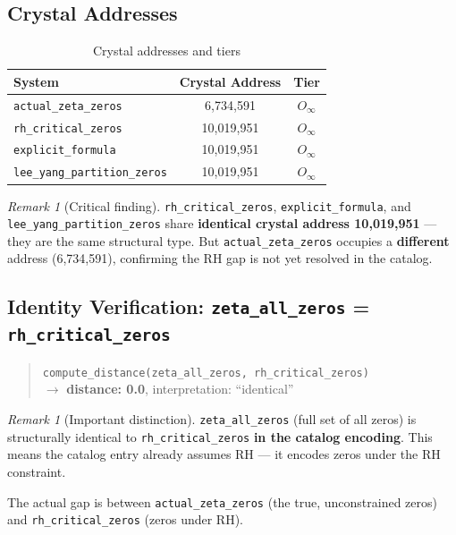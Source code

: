 \documentclass[12pt,oneside]{article}
\theoremstyle{definition}
\theoremstyle{remark}
\newtheorem{remark}[theorem]{Remark}
\begin{document}
\subsection{Crystal Addresses}

\begin{table}[htbp]
\centering
\caption{Crystal addresses and tiers}
\begin{tabular}{lcc}
\toprule
System & Crystal Address & Tier \\
\midrule
\texttt{actual\_zeta\_zeros}        & 6,734,591  & $O_\infty$ \\
\texttt{rh\_critical\_zeros}        & 10,019,951 & $O_\infty$ \\
\texttt{explicit\_formula}          & 10,019,951 & $O_\infty$ \\
\texttt{lee\_yang\_partition\_zeros} & 10,019,951 & $O_\infty$ \\
\bottomrule
\end{tabular}
\end{table}

\begin{remark}[Critical finding]
\texttt{rh\_critical\_zeros}, \texttt{explicit\_formula}, and \texttt{lee\_yang\_partition\_zeros} share \textbf{identical crystal address 10,019,951} --- they are the same structural type. But \texttt{actual\_zeta\_zeros} occupies a \textbf{different} address (6,734,591), confirming the RH gap is not yet resolved in the catalog.
\end{remark}

\subsection{Identity Verification: \texttt{zeta\_all\_zeros} = \texttt{rh\_critical\_zeros}}

\begin{quote}
\texttt{compute\_distance(zeta\_all\_zeros, rh\_critical\_zeros)}\\
$\to$ \textbf{distance: 0.0}, interpretation: ``identical''
\end{quote}

\begin{remark}[Important distinction]
\texttt{zeta\_all\_zeros} (full set of all zeros) is structurally identical to \texttt{rh\_critical\_zeros} \textbf{in the catalog encoding}. This means the catalog entry already assumes RH --- it encodes zeros under the RH constraint.

The actual gap is between \texttt{actual\_zeta\_zeros} (the true, unconstrained zeros) and \texttt{rh\_critical\_zeros} (zeros under RH).
\end{remark}
\end{document}
